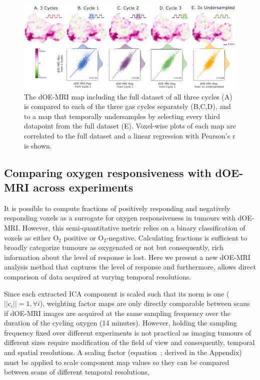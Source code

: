 \begin{figure}[htbp]
   \centering
   \includegraphics[width=\textwidth]{oemri_thesis1/oemri_thesis1-images/fig4_repeatability.pdf} %
   \caption{The dOE-MRI map including the full dataset of all three cycles (A) is compared to each of the three gas cycles separately (B,C,D), and to a map that temporally undersamples by selecting every third datapoint from the full dataset (E).
Voxel-wise plots of each map are correlated to the full dataset and a linear regression with Pearson's r is shown.
   \label{fig_repeatability}}
\end{figure}

\subsection{Comparing oxygen responsiveness with dOE-MRI across experiments}
\label{sec:correctionfactor}
It is possible to compute fractions of positively responding and negatively responding voxels as a surrogate for oxygen responsiveness in tumours with dOE-MRI.
However, this semi-quantitative metric relies on a binary classification of voxels as either O$_2$ positive or O$_2$-negative.
Calculating fractions is sufficient to broadly categorize tumours as oxygenated or not but consequently, rich information about the level of response is lost.
Here we present a new dOE-MRI analysis method that captures the level of response and furthermore, allows direct comparison of data acquired at varying temporal resolutions.

Since each extracted ICA component is scaled such that its norm is one ($||c_i||=1, \forall i $), weighting factor maps are only directly comparable between scans if dOE-MRI images are acquired at the same sampling frequency over the duration of the cycling oxygen (14 minutes).
However, holding the sampling frequency fixed over different experiments is not practical as imaging tumours of different sizes require modification of the field of view and consequently, temporal and spatial resolutions.
A scaling factor (equation~\label{correctionfactor}; derived in the Appendix) must be applied to scale component map values so they can be compared between scans of different temporal resolutions,

